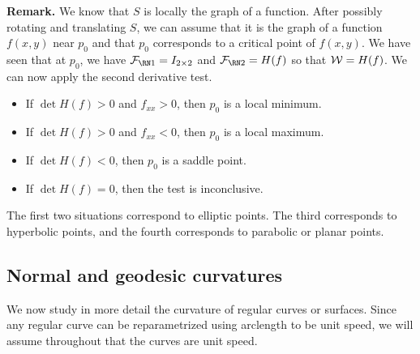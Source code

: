 {\bf Remark.} We know that $S$ is locally the graph of a function. After 
possibly rotating and translating $S$, we can assume that it is the graph 
of a function $f(x, y)$ near $p_0$ and that $p_0$ corresponds to a critical 
point of $f(x, y)$. We have seen that at $p_0$, we have 
$\FFF = I_{2\times 2}$ and $\SFF = H(f)$ so that ${\cal W} = H(f)$. 
We can now apply the second derivative test. 
\begin{itemize}
    \item If $\det H(f) > 0$ and $f_{xx} > 0$, then $p_0$ is a local minimum. 
    \item If $\det H(f) > 0$ and $f_{xx} < 0$, then $p_0$ is a local maximum. 
    \item If $\det H(f) < 0$, then $p_0$ is a saddle point. 
    \item If $\det H(f) = 0$, then the test is inconclusive. 
\end{itemize}
The first two situations correspond to elliptic points. The third 
corresponds to hyperbolic points, and the fourth corresponds to parabolic or 
planar points.

\subsection{Normal and geodesic curvatures} \label{subsec:3.4}
We now study in more detail the curvature of regular curves 
or surfaces. Since any regular curve can be reparametrized using arclength 
to be unit speed, we will assume throughout that the curves are unit speed. 

